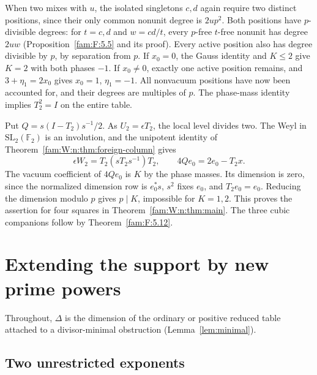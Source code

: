 \documentclass[11pt,a4paper]{article}
\numberwithin{equation}{section}
\theoremstyle{remark}
\begin{document}
When two mixes with $u$, the isolated singletons $c,d$ again
require two distinct positions, since their only common nonunit
degree is $2up^2$. Both positions have $p$-divisible degrees:
for $t=c,d$ and $w=cd/t$, every $p$-free $t$-free nonunit has
degree $2uw$ (Proposition~\ref{fam:F:5.5} and its proof). Every active
position also has degree divisible by $p$, by separation from $p$.
If $x_0=0$, the Gauss identity and $K\le2$ give $K=2$ with both
phases $-1$. If $x_0\ne0$, exactly one active position remains,
and $3+\eta_1=2x_0$ gives $x_0=1$, $\eta_1=-1$. All nonvacuum
positions have now been accounted for, and their degrees are multiples
of $p$. The phase-mass identity implies $T_2^2=I$ on the entire table.

Put $Q=s(I-T_2)s^{-1}/2$. As $U_2=\epsilon T_2$, the local
level divides two. The Weyl in $\mathrm{SL}_2(\mathbb F_2)$ is an
involution, and the unipotent identity of
Theorem~\ref{fam:W:n:thm:foreign-column} gives
\[
              \epsilon W_2=T_2(sT_2s^{-1})T_2,\qquad
              4Qe_0=2e_0-T_2x.
\]
The vacuum coefficient of $4Qe_0$ is $K$ by the phase masses.
Its dimension is zero, since the normalized dimension row is $e_0^*s$,
$s^2$ fixes $e_0$, and $T_2e_0=e_0$. Reducing the dimension modulo
$p$ gives $p\mid K$, impossible for $K=1,2$. This proves
the assertion for four squares in Theorem~\ref{fam:W:n:thm:main}. The three cubic companions follow by Theorem~\ref{fam:F:5.12}.

\section{Extending the support by new prime powers}\label{ext:section}
Throughout, $\Delta$ is the dimension of the ordinary or positive reduced table attached to a divisor-minimal obstruction (Lemma~\ref{lem:minimal}).
\subsection{Two unrestricted exponents}
\label{ext:sec:two-free-crossing}
\end{document}
